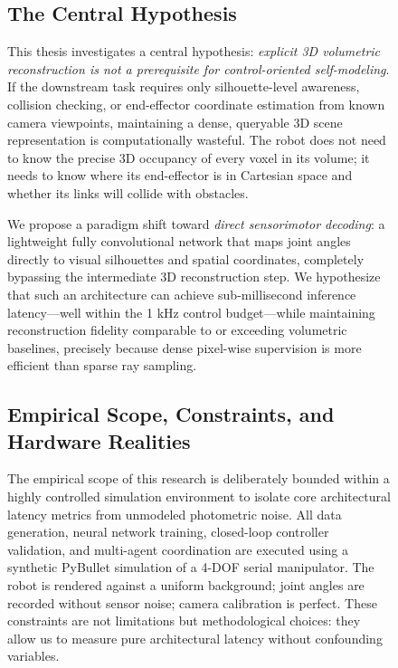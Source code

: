 \documentclass[12pt,a4paper,oneside]{report}
\begin{document}
\begin{figure}[H]
\subsection{The Central Hypothesis}
\label{subsec:central_hypothesis_intro}

This thesis investigates a central hypothesis: \textit{explicit 3D volumetric reconstruction is not a prerequisite for control-oriented self-modeling}. If the downstream task requires only silhouette-level awareness, collision checking, or end-effector coordinate estimation from known camera viewpoints, maintaining a dense, queryable 3D scene representation is computationally wasteful. The robot does not need to know the precise 3D occupancy of every voxel in its volume; it needs to know where its end-effector is in Cartesian space and whether its links will collide with obstacles.

We propose a paradigm shift toward \textit{direct sensorimotor decoding}: a lightweight fully convolutional network that maps joint angles directly to visual silhouettes and spatial coordinates, completely bypassing the intermediate 3D reconstruction step. We hypothesize that such an architecture can achieve sub-millisecond inference latency---well within the 1 kHz control budget---while maintaining reconstruction fidelity comparable to or exceeding volumetric baselines, precisely because dense pixel-wise supervision is more efficient than sparse ray sampling.

\subsection{Empirical Scope, Constraints, and Hardware Realities}
\label{subsec:empirical_scope_intro}

The empirical scope of this research is deliberately bounded within a highly controlled simulation environment to isolate core architectural latency metrics from unmodeled photometric noise. All data generation, neural network training, closed-loop controller validation, and multi-agent coordination are executed using a synthetic PyBullet simulation of a 4-DOF serial manipulator. The robot is rendered against a uniform background; joint angles are recorded without sensor noise; camera calibration is perfect. These constraints are not limitations but methodological choices: they allow us to measure pure architectural latency without confounding variables.


\end{figure}
\end{document}
